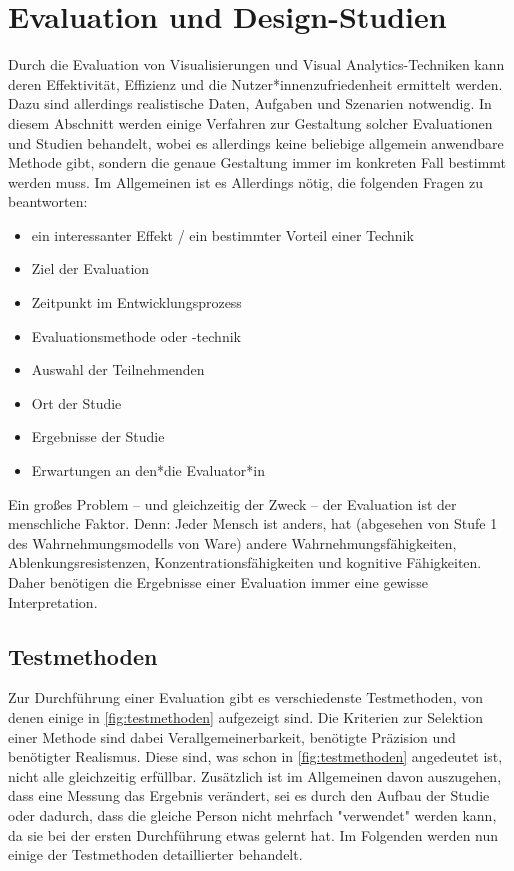	\section{Evaluation und Design-Studien} %
		Durch die Evaluation von Visualisierungen und Visual Analytics-Techniken kann deren Effektivität, Effizienz und die Nutzer*innenzufriedenheit ermittelt werden. Dazu sind allerdings realistische Daten, Aufgaben und Szenarien notwendig. In diesem Abschnitt werden einige Verfahren zur Gestaltung solcher Evaluationen und Studien behandelt, wobei es allerdings keine beliebige allgemein anwendbare Methode gibt, sondern die genaue Gestaltung immer im konkreten Fall bestimmt werden muss. Im Allgemeinen ist es Allerdings nötig, die folgenden Fragen zu beantworten:
		\begin{itemize}
			\item {} ein interessanter Effekt / ein bestimmter Vorteil einer Technik
			\item {} Ziel der Evaluation
			\item {}  Zeitpunkt im Entwicklungsprozess
			\item {}   Evaluationsmethode oder -technik
			\item {}   Auswahl der Teilnehmenden
			\item {}    Ort der Studie
			\item {} Ergebnisse der Studie
			\item {}   Erwartungen an den*die Evaluator*in
		\end{itemize}
		Ein großes Problem -- und gleichzeitig der Zweck -- der Evaluation ist der menschliche Faktor. Denn: Jeder Mensch ist anders, hat (abgesehen von Stufe 1 des Wahrnehmungsmodells von Ware) andere Wahrnehmungsfähigkeiten, Ablenkungsresistenzen, Konzentrationsfähigkeiten und kognitive Fähigkeiten. Daher benötigen die Ergebnisse einer Evaluation immer eine gewisse Interpretation.

		\subsection{Testmethoden}
			Zur Durchführung einer Evaluation gibt es verschiedenste Testmethoden, von denen einige in \autoref{fig:testmethoden} aufgezeigt sind. Die Kriterien zur Selektion einer Methode sind dabei \bspw Verallgemeinerbarkeit, benötigte Präzision und benötigter Realismus. Diese sind, was schon in \autoref{fig:testmethoden} angedeutet ist, nicht alle gleichzeitig erfüllbar. Zusätzlich ist im Allgemeinen davon auszugehen, dass eine Messung das Ergebnis verändert, sei es durch den Aufbau der Studie oder dadurch, dass die gleiche Person nicht mehrfach "verwendet" werden kann, da sie bei der ersten Durchführung etwas gelernt hat. Im Folgenden werden nun einige der Testmethoden detaillierter behandelt.

